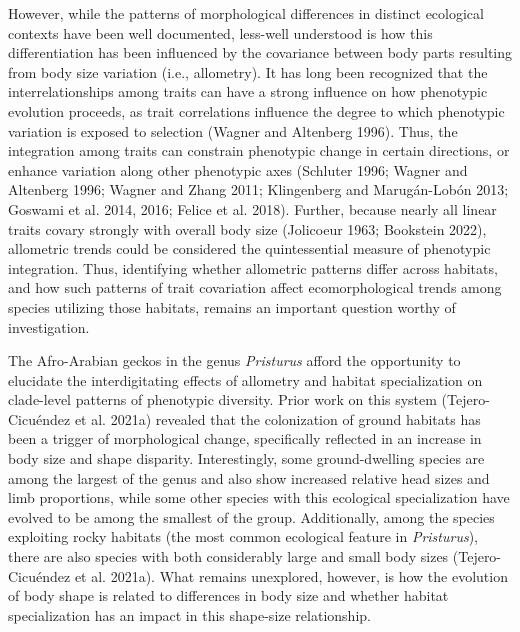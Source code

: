\documentclass[
  11pt,
]{article}
\providecommand{\DIFaddtex}[1]{{\protect\color{blue}\uwave{#1}}} %
\providecommand{\DIFaddbegin}{} %
\providecommand{\DIFaddend}{} %
\providecommand{\DIFadd}[1]{\texorpdfstring{\DIFaddtex{#1}}{#1}} %
\newcommand{\DIFaddincludegraphics}[2][]{{\color{blue}\fbox{\DIFOincludegraphics[#1]{#2}}}} %
\DeclareRobustCommand{\DIFaddbegin}{\DIFOaddbegin \let\includegraphics\DIFaddincludegraphics} %
\DeclareRobustCommand{\DIFaddend}{\DIFOaddend \let\includegraphics\DIFOincludegraphics} %
\begin{document}
However, while the patterns of morphological differences in distinct
ecological contexts have been well documented, less-well understood is
how this differentiation has been influenced by the covariance between
body parts resulting from body size variation (i.e., allometry). It has
long been recognized that the interrelationships among traits can have a
strong influence on how phenotypic evolution proceeds, as trait
correlations influence the degree to which phenotypic variation is
exposed to selection (Wagner and Altenberg 1996). Thus, the integration
among traits can constrain phenotypic change in certain directions, or
enhance variation along other phenotypic axes (Schluter 1996; Wagner and
Altenberg 1996; Wagner and Zhang 2011; Klingenberg and Marugán-Lobón
2013; Goswami et al. 2014, 2016; Felice et al. 2018\DIFaddbegin \DIFadd{; Navalón et al.
2020}\DIFaddend ). Further, because nearly all linear traits covary strongly with
overall body size (Jolicoeur 1963; Bookstein 2022), allometric trends
could be considered the quintessential measure of phenotypic
integration. Thus, identifying whether allometric patterns differ across
habitats, and how such patterns of trait covariation affect
ecomorphological trends among species utilizing those habitats, remains
an important question worthy of investigation. \hfill\break

The Afro-Arabian geckos in the genus \emph{Pristurus} afford the
opportunity to elucidate the interdigitating effects of allometry and
habitat specialization on clade-level patterns of phenotypic diversity.
Prior work on this system (Tejero-Cicuéndez et al. 2021a) revealed that
the colonization of ground habitats has been a trigger of morphological
change, specifically reflected in an increase in body size and shape
disparity. Interestingly, some ground-dwelling species are among the
largest of the genus and also show increased relative head sizes and
limb proportions, while some other species with this ecological
specialization have evolved to be among the smallest of the group.
Additionally, among the species exploiting rocky habitats (the most
common ecological feature in \emph{Pristurus}), there are also species
with both considerably large and small body sizes (Tejero-Cicuéndez et
al. 2021a). What remains unexplored, however, is how the evolution of
body shape is related to differences in body size and whether habitat
specialization has an impact in this shape-size relationship.
\hfill\break
\end{document}
